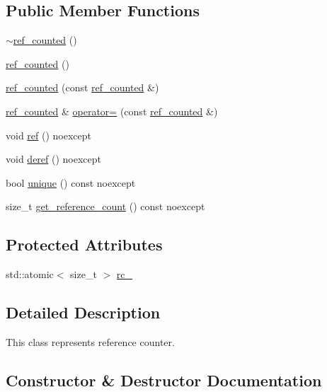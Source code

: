 \subsection*{Public Member Functions}
\begin{DoxyCompactItemize}
\item 
\hyperlink{classactor__zeta_1_1ref__counted_a4e0a85b3b0695a1dc75a393a1b2d7b2e}{$\sim$ref\+\_\+counted} ()
\item 
\hyperlink{classactor__zeta_1_1ref__counted_a8ed09fe39540b2071a9053e812488f0a}{ref\+\_\+counted} ()
\item 
\hyperlink{classactor__zeta_1_1ref__counted_a1832dc33726eac41487e8979e1c2414c}{ref\+\_\+counted} (const \hyperlink{classactor__zeta_1_1ref__counted}{ref\+\_\+counted} \&)
\item 
\hyperlink{classactor__zeta_1_1ref__counted}{ref\+\_\+counted} \& \hyperlink{classactor__zeta_1_1ref__counted_a80302bec44f29ad126c1a04df4a5ce7f}{operator=} (const \hyperlink{classactor__zeta_1_1ref__counted}{ref\+\_\+counted} \&)
\item 
void \hyperlink{classactor__zeta_1_1ref__counted_a46d576dc69eabe39d4c2add161146c23}{ref} () noexcept
\item 
void \hyperlink{classactor__zeta_1_1ref__counted_a3eb2cea75b11216397ac62fbe2101b86}{deref} () noexcept
\item 
bool \hyperlink{classactor__zeta_1_1ref__counted_aa24a0ed9e05d6efc06f8acf879ada836}{unique} () const noexcept
\item 
size\+\_\+t \hyperlink{classactor__zeta_1_1ref__counted_a7fc9ccc71d03d20b3178f45a1ae57713}{get\+\_\+reference\+\_\+count} () const noexcept
\end{DoxyCompactItemize}
\subsection*{Protected Attributes}
\begin{DoxyCompactItemize}
\item 
std\+::atomic$<$ size\+\_\+t $>$ \hyperlink{classactor__zeta_1_1ref__counted_a0af281a31b61d3834cf1a79a81f871a8}{rc\+\_\+}
\end{DoxyCompactItemize}


\subsection{Detailed Description}
This class represents reference counter. 

\subsection{Constructor \& Destructor Documentation}
\mbox{\label{classactor__zeta_1_1ref__counted_a4e0a85b3b0695a1dc75a393a1b2d7b2e}} 
